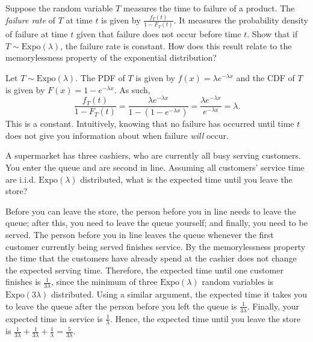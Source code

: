 	\begin{exercise}
		Suppose the random variable $T$ measures the time to failure of a product. The \emph{failure rate} of $T$ at time $t$ is given by $\frac{f_T(t)}{1 - F_T(t)}$. It measures the probability density of failure at time $t$ given that failure does not occur before time $t$. Show that if $T \sim \text{Expo}(\lambda)$, the failure rate is constant. How does this result relate to the memorylessness property of the exponential distribution?
		\begin{solution}
			Let $T \sim \text{Expo}(\lambda)$. The PDF of $T$ is given by $f(x) = \lambda e^{- \lambda x}$ and the CDF of $T$ is given by $F(x) = 1 - e^{- \lambda x}$. As such,
			\begin{equation*}
				\frac{f_T(t)}{1 - F_T(t)} = \frac{\lambda e^{- \lambda x}}{1 - (1 - e^{- \lambda x})} = \frac{\lambda e^{- \lambda x}}{e^{- \lambda x}} = \lambda.
			\end{equation*}
			This is a constant. Intuitively, knowing that no failure has occurred until time $t$ does not give you information about when failure \emph{will} occur.
		\end{solution}
	\end{exercise}
	
	\begin{exercise}
		A supermarket has three cashiers, who are currently all busy serving customers. You enter the queue and are second in line. Assuming all customers' service time are i.i.d. $\text{Expo}(\lambda)$ distributed, what is the expected time until you leave the store?
		\begin{solution}
			Before you can leave the store, the person before you in line needs to leave the queue; after this, you need to leave the queue yourself; and finally, you need to be served. The person before you in line leaves the queue whenever the first customer currently being served finishes service. By the memorylessness property the time that the customers have already spend at the cashier does not change the expected serving time. Therefore, the expected time until one customer finishes is $\frac{1}{3 \lambda}$, since the minimum of three $\text{Expo}(\lambda)$ random variables is $\text{Expo}(3 \lambda)$ distributed. Using a similar argument, the expected time it takes you to leave the queue after the person before you left the queue is $\frac{1}{3 \lambda}$. Finally, your expected time in service is $\frac{1}{\lambda}$. Hence, the expected time until you leave the store is $\frac{1}{3 \lambda} + \frac{1}{3 \lambda} + \frac{1}{\lambda} = \frac{5}{3 \lambda}$.
		\end{solution}
	\end{exercise}

